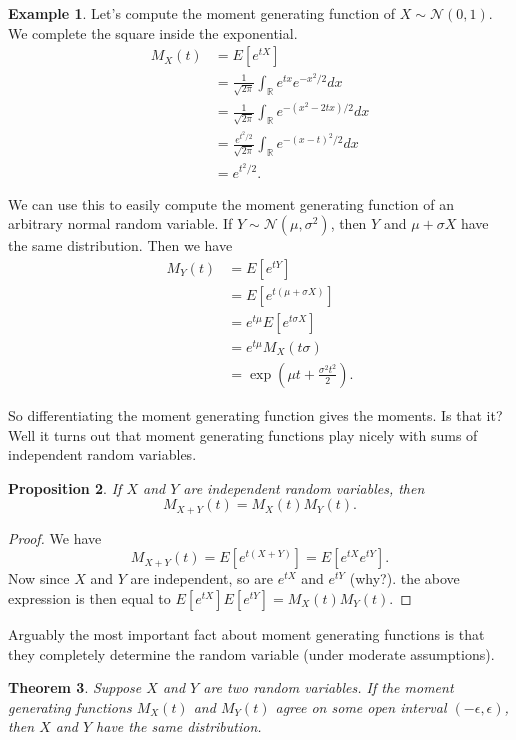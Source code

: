 \documentclass[12pt]{article}
\theoremstyle{plain}
\newtheorem{theorem}{Theorem}[section]
\newtheorem{proposition}[theorem]{Proposition}
\theoremstyle{definition}
\newtheorem{example}[theorem]{Example}
\theoremstyle{remark}
\newcommand{\R}{\mathbb{R}}
\begin{document}
\begin{example}\label{normal MGF}
    Let's compute the moment generating function of $X\sim \mathcal{N}(0,1)$.
    We complete the square inside the exponential.
    \begin{align*}
        M_X(t) &= E[e^{tX}]\\
        &= \frac{1}{\sqrt{2\pi}}\int_\R e^{tx}e^{-x^2/2}dx\\
        &= \frac{1}{\sqrt{2\pi}}\int_\R e^{-(x^2-2tx)/2}dx\\
        &= \frac{e^{t^2/2}}{\sqrt{2\pi}}\int_\R e^{-(x-t)^2/2}dx\\
        &= e^{t^2/2}.
    \end{align*}

    We can use this to easily compute the moment generating function of an arbitrary normal random variable.
    If $Y\sim \mathcal{N}(\mu, \sigma^2)$, then $Y$ and $\mu + \sigma X$ have the same distribution.
    Then we have
    \begin{align*}
        M_Y(t) &= E[e^{tY}]\\
        &= E[e^{t(\mu + \sigma X)}]\\
        &= e^{t\mu}E[e^{t\sigma X}]\\
        &= e^{t\mu}M_X(t\sigma)\\
        &= \exp\left(\mu t + \frac{\sigma^2t^2}{2} \right).
    \end{align*}
\end{example}

So differentiating the moment generating function gives the moments.
Is that it?
Well it turns out that moment generating functions play nicely with sums of independent random variables.

\begin{proposition}
    If $X$ and $Y$ are independent random variables, then
    \[
        M_{X+Y}(t) = M_X(t)M_Y(t).
    \]
\end{proposition}
\begin{proof}
    We have
    \[
        M_{X+Y}(t) = E[e^{t(X+Y)}] = E[e^{tX}e^{tY}].
    \]
    Now since $X$ and $Y$ are independent, so are $e^{tX}$ and $e^{tY}$ (why?).
    the above expression is then equal to $E[e^{tX}]E[e^{tY}] = M_X(t)M_Y(t)$.
\end{proof}

Arguably the most important fact about moment generating functions is that they completely determine the random variable (under moderate assumptions).

\begin{theorem}
    Suppose $X$ and $Y$ are two random variables.
    If the moment generating functions $M_X(t)$ and $M_Y(t)$ agree on some open interval $(-\epsilon, \epsilon)$, then $X$ and $Y$ have the same distribution.
\end{theorem}
\end{document}
